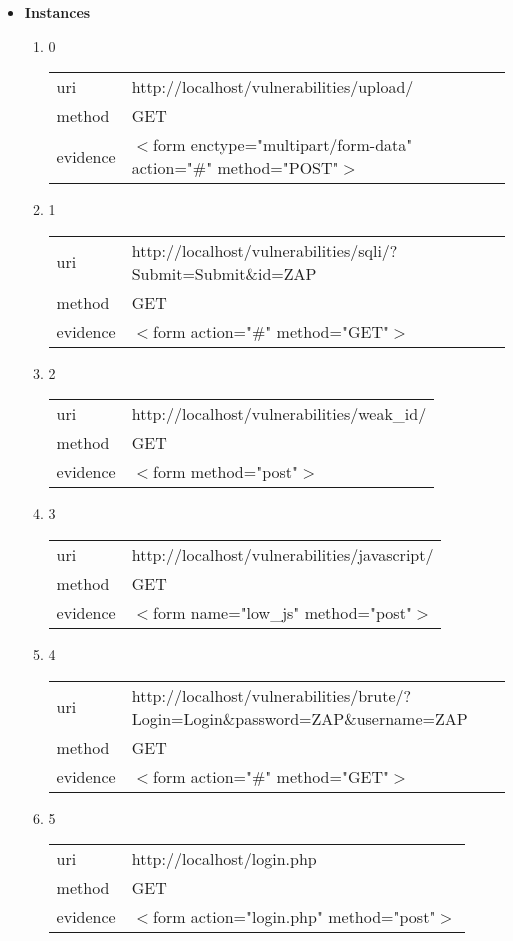 \documentclass[10pt]{article}
\begin{document}
\begin{itemize}
\item[] \textbf{Instances}
\begin{enumerate}
\item[] 0
\begin{tabular}{| l | p{12cm}}
uri & http://localhost/vulnerabilities/upload/ \\
method & GET \\
evidence & $<$form enctype="multipart/form-data" action="\#" method="POST"$>$ \\
\end{tabular}
\item[] 1
\begin{tabular}{| l | p{12cm}}
uri & http://localhost/vulnerabilities/sqli/?Submit=Submit\&id=ZAP \\
method & GET \\
evidence & $<$form action="\#" method="GET"$>$ \\
\end{tabular}
\item[] 2
\begin{tabular}{| l | p{12cm}}
uri & http://localhost/vulnerabilities/weak\_id/ \\
method & GET \\
evidence & $<$form method="post"$>$ \\
\end{tabular}
\item[] 3
\begin{tabular}{| l | p{12cm}}
uri & http://localhost/vulnerabilities/javascript/ \\
method & GET \\
evidence & $<$form name="low\_js" method="post"$>$ \\
\end{tabular}
\item[] 4
\begin{tabular}{| l | p{12cm}}
uri & http://localhost/vulnerabilities/brute/?Login=Login\&password=ZAP\&username=ZAP \\
method & GET \\
evidence & $<$form action="\#" method="GET"$>$ \\
\end{tabular}
\item[] 5
\begin{tabular}{| l | p{12cm}}
uri & http://localhost/login.php \\
method & GET \\
evidence & $<$form action="login.php" method="post"$>$ \\

\end{tabular}
\end{enumerate}
\end{itemize}
\end{document}
